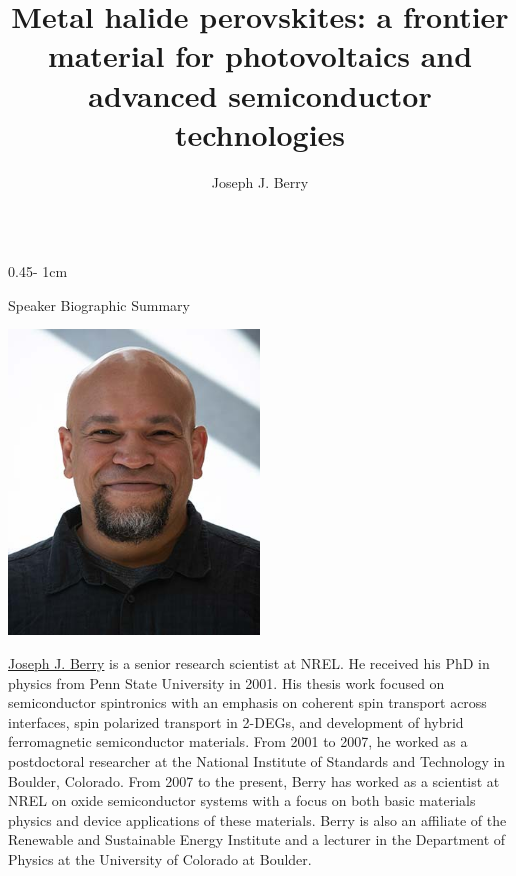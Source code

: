\documentclass{../psuposter}
\title{Metal halide perovskites: a frontier material for photovoltaics and advanced semiconductor technologies}
\author{Joseph J. Berry}
\institute{National Renewable Energy Laboratory, Golden, Colorado}
\begin{document}
\begin{frame}
\begin{columns}[t, totalwidth=\textwidth]
\begin{column}{0.45\textwidth - 1cm}


    \begin{block}{Speaker Biographic Summary}
    	\begin{center}
    		\includegraphics[width=0.5\textwidth]{images/berry}
    	\end{center}
    	\href{https://www.nrel.gov/research/staff/joseph-berry.html}{Joseph J. Berry} is a senior research scientist at NREL. He received his PhD in physics from Penn State University in 2001. His thesis work focused on semiconductor spintronics with an emphasis on coherent spin transport across interfaces, spin polarized transport in 2-DEGs, and development of hybrid ferromagnetic semiconductor materials. 
    	From 2001 to 2007, he worked as a postdoctoral researcher at the National Institute of Standards and Technology in Boulder, Colorado.
    	From 2007 to the present, Berry has worked as a scientist at NREL on oxide semiconductor systems with a focus on both basic materials physics and device applications of these materials. Berry is also an affiliate of the Renewable and Sustainable Energy Institute and a lecturer in the Department of Physics at the University of Colorado at Boulder.
    \end{block}



\end{column}
\end{columns}
\end{frame}
\end{document}

